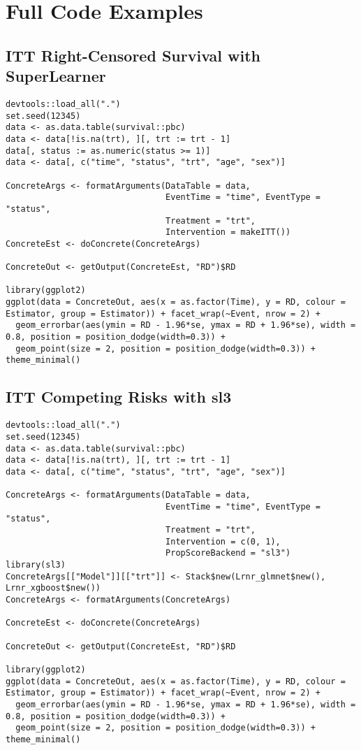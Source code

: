 \documentclass{report}
\newcommand{\1}{\ensuremath{\mathbf{1}}}
\begin{document}
\chapter{Full Code Examples}
\section{ITT Right-Censored Survival with SuperLearner}
\begin{lstlisting}
devtools::load_all(".")
set.seed(12345)
data <- as.data.table(survival::pbc)
data <- data[!is.na(trt), ][, trt := trt - 1]
data[, status := as.numeric(status >= 1)]
data <- data[, c("time", "status", "trt", "age", "sex")]

ConcreteArgs <- formatArguments(DataTable = data,
                                EventTime = "time", EventType = "status",
                                Treatment = "trt",
                                Intervention = makeITT())
ConcreteEst <- doConcrete(ConcreteArgs)

ConcreteOut <- getOutput(ConcreteEst, "RD")$RD

library(ggplot2)
ggplot(data = ConcreteOut, aes(x = as.factor(Time), y = RD, colour = Estimator, group = Estimator)) + facet_wrap(~Event, nrow = 2) + 
  geom_errorbar(aes(ymin = RD - 1.96*se, ymax = RD + 1.96*se), width = 0.8, position = position_dodge(width=0.3)) +
  geom_point(size = 2, position = position_dodge(width=0.3)) + theme_minimal()
\end{lstlisting}

\section{ITT Competing Risks with sl3}
\begin{lstlisting}
devtools::load_all(".")
set.seed(12345)
data <- as.data.table(survival::pbc)
data <- data[!is.na(trt), ][, trt := trt - 1]
data <- data[, c("time", "status", "trt", "age", "sex")]

ConcreteArgs <- formatArguments(DataTable = data,
                                EventTime = "time", EventType = "status",
                                Treatment = "trt",
                                Intervention = c(0, 1),
                                PropScoreBackend = "sl3")
library(sl3)
ConcreteArgs[["Model"]][["trt"]] <- Stack$new(Lrnr_glmnet$new(), Lrnr_xgboost$new())
ConcreteArgs <- formatArguments(ConcreteArgs)

ConcreteEst <- doConcrete(ConcreteArgs)

ConcreteOut <- getOutput(ConcreteEst, "RD")$RD

library(ggplot2)
ggplot(data = ConcreteOut, aes(x = as.factor(Time), y = RD, colour = Estimator, group = Estimator)) + facet_wrap(~Event, nrow = 2) + 
  geom_errorbar(aes(ymin = RD - 1.96*se, ymax = RD + 1.96*se), width = 0.8, position = position_dodge(width=0.3)) +
  geom_point(size = 2, position = position_dodge(width=0.3)) + theme_minimal()
\end{lstlisting}
\end{document}
